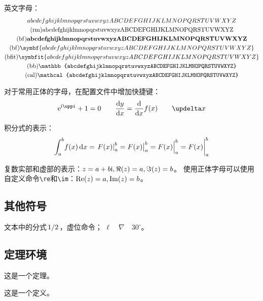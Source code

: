 英文字母：
\begin{gather*}
  abcdefghijklmnopqrstuvwxyzABCDEFGHIJKLMNOPQRSTUVWXYZ
  \\
  (\mathrm{rm})\mathrm{abcdefghijklmnopqrstuvwxyzABCDEFGHIJKLMNOPQRSTUVWXYZ}
  \\
  (\mathrm{bf})\mathbf{abcdefghijklmnopqrstuvwxyzABCDEFGHIJKLMNOPQRSTUVWXYZ}
  \\
  (\mathrm{bf})\symbf{abcdefghijklmnopqrstuvwxyzABCDEFGHIJKLMNOPQRSTUVWXYZ}
  \\
  (\mathrm{bfit})\symbfit{abcdefghijklmnopqrstuvwxyzABCDEFGHIJKLMNOPQRSTUVWXYZ}
  \\
  (\mathrm{bb})\mathbb{abcdefghijklmnopqrstuvwxyzABCDEFGHIJKLMNOPQRSTUVWXYZ}
  \\
  (\mathrm{cal})\mathcal{abcdefghijklmnopqrstuvwxyzABCDEFGHIJKLMNOPQRSTUVWXYZ}
\end{gather*}

对于常用正体的字母，在配置文件中增加快捷键：
\begin{align*}
  \me^{\mi\mpi}+1=0 \qquad
  \mdd{y}{x}=\frac{\md }{\md x}f(x) \qquad
  \mdl x
\end{align*}

积分式的表示：
\begin{equation*}
  \int_a^b\! f(x)\,\mathrm{d} x = \left.F(x)\right|_a^b=F(x)\big|_a^b=F(x)\Big|_a^b=F(x)\bigg|_a^b
\end{equation*}

复数实部和虚部的表示：$z=a+b\mathrm{i},\Re(z)=a,\Im(z)=b$。
使用正体字母可以使用自定义命令\verb|\re|和\verb|\im|：$\mathrm{Re}(z)=a,\mathrm{Im}(z)=b$。


\subsection{其他符号}

文本中的分式$\left.1\middle/2\right.$，虚位\phantom{字}命令；
$\ell \quad \nabla \quad 30^{\circ} $。

\subsection{定理环境}

\begin{theorem}[定理名字]
  这是一个定理。
\end{theorem}

\begin{definition}[定义名字]
  这是一个定义。
\end{definition}

